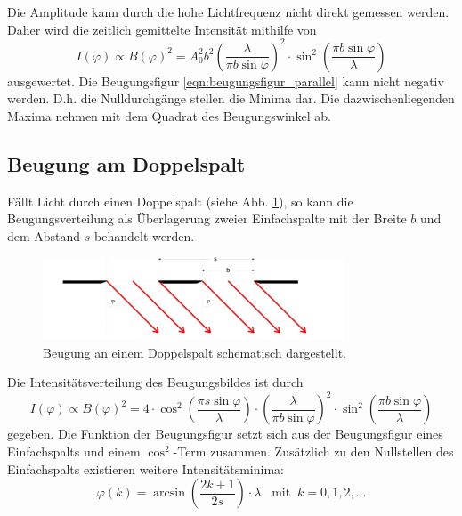 Die Amplitude kann durch die hohe Lichtfrequenz nicht direkt gemessen werden.
Daher wird die zeitlich gemittelte Intensität mithilfe von
\begin{equation}
    I(\varphi) \propto B(\varphi)^2 = A^2_0 b^2 \left(\frac{\lambda}{\pi b \sin \varphi} \right)^2 \cdot \sin^2 \left ( \frac{\pi b \sin \varphi}{\lambda} \right )
    \label{eqn:beugungsfigur_parallel}
\end{equation}
ausgewertet.
Die Beugungsfigur \eqref{eqn:beugungsfigur_parallel} kann nicht negativ werden.
D.h. die Nulldurchgänge stellen die Minima dar.
Die dazwischenliegenden Maxima nehmen mit dem Quadrat des Beugungswinkel ab.

\subsection{Beugung am Doppelspalt}
Fällt Licht durch einen Doppelspalt (siehe Abb. \ref{fig:doppelspalt}), so kann die Beugungsverteilung als Überlagerung zweier Einfachspalte mit der Breite $b$ und dem Abstand $s$ behandelt werden.
\begin{figure}
    \centering
    \includegraphics[width=0.8\textwidth]{content/data/doppelspalt.jpg}
    \caption{Beugung an einem Doppelspalt schematisch dargestellt. \cite[5]{anleitung}}
    \label{fig:doppelspalt}
\end{figure}
Die Intensitätsverteilung des Beugungsbildes ist durch
\begin{equation}
    I(\varphi) \propto B(\varphi)^2 = 4 \cdot \cos^2 \left( \frac{\pi s \sin \varphi}{\lambda} \right) \cdot \left( \frac{\lambda}{\pi b \sin \varphi} \right)^2 \cdot \sin^2 \left ( \frac{\pi b \sin \varphi}{\lambda} \right )
    \label{eqn:beugungsfigur_doppel}
\end{equation}
gegeben.
Die Funktion der Beugungsfigur setzt sich aus der Beugungsfigur eines Einfachspalts und einem $\cos^2$-Term zusammen.
Zusätzlich zu den Nullstellen des Einfachspalts existieren weitere Intensitätsminima:
\begin{equation*}
    \varphi(k) = \arcsin \left( \frac{2k+1}{2s} \right) \cdot \lambda \;\;\; \text{mit} \;\; k = 0, 1, 2, ...
\end{equation*}

